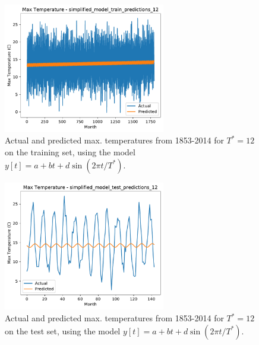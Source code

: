 \documentclass[12pt,twoside]{article}
\begin{document}
\begin{enumerate}
\begin{enumerate}
	\begin{figure}[H]
		\centering
		\captionsetup{justification=centering}
		\includegraphics[width=200pt]{code/Q2/simplified_model_train_predictions_12_fit.pdf}
		\caption{Actual and predicted max. temperatures from 1853-2014 \newline for $T^{\ast}=12$ on the training set, using the model $y[t] = a + bt + d \sin(2\pi t/T^{\ast})$.}
		\label{simplemodel}
	\end{figure}

	\begin{figure}[H]
		\centering
		\captionsetup{justification=centering}
		\includegraphics[width=200pt]{code/Q2/simplified_model_test_predictions_12_fit.pdf}
		\caption{Actual and predicted max. temperatures from 1853-2014 \newline for $T^{\ast}=12$ on the test set, using the model $y[t] = a + bt + d \sin(2\pi t/T^{\ast})$.}
	\end{figure}



\end{enumerate}
\end{enumerate}
\end{document}
